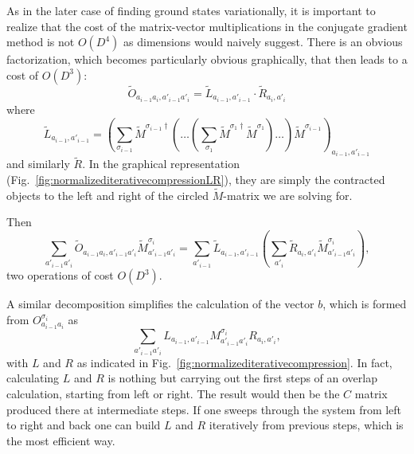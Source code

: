 As in the later case of finding ground states variationally, it is important to realize that the cost of the matrix-vector multiplications in the conjugate gradient method is not $O(D^4)$ as dimensions would naively suggest. There is an obvious factorization, which becomes particularly obvious graphically, that then leads to a cost of $O(D^3)$:
\begin{equation}
\tilde{O}_{a_{i-1}a_i,a'_{i-1}a'_i} = \tilde{L}_{a_{i-1},a'_{i-1}} \cdot \tilde{R}_{a_{i},a'_{i}}
\end{equation}
where 
\begin{equation}
\tilde{L}_{a_{i-1},a'_{i-1}} = \left( \sum_{\sigma_{i-1}}  \tilde{M}^{\sigma_{i-1}\dagger} \left( \ldots \left( \sum_{\sigma_1}  
\tilde{M}^{\sigma_{1}\dagger} \tilde{M}^{\sigma_{1}} \right) \ldots \right) \tilde{M}^{\sigma_{i-1}} \right)_{a_{i-1},a'_{i-1}}
\end{equation}
and similarly $\tilde{R}$. In the graphical representation (Fig.~\ref{fig:normalizediterativecompressionLR}), they are simply the contracted objects to the left and right of the circled $\tilde{M}$-matrix we are solving for.

Then 
\begin{equation}
\sum_{a'_{i-1}a'_i} \tilde{O}_{a_{i-1}a_i,a'_{i-1}a'_i} \tilde{M}^{\sigma_i}_{a'_{i-1}a'_i} =
\sum_{a'_{i-1}} \tilde{L}_{a_{i-1},a'_{i-1}} \left( \sum_{a'_i} \tilde{R}_{a_{i},a'_{i}}
 \tilde{M}^{\sigma_i}_{a'_{i-1}a'_i} \right),
\end{equation}
two operations of cost $O(D^3)$.

A similar decomposition simplifies the calculation of the vector $b$, which is formed from $O^{\sigma_i}_{a_{i-1}a_i}$ as
\begin{equation}
\sum_{a'_{i-1}a'_i} L_{a_{i-1},a'_{i-1}} M^{\sigma_i}_{a'_{i-1}a'_i} R_{a_{i},a'_{i}} , 
\end{equation}
with $L$ and $R$ as indicated in Fig.~\ref{fig:normalizediterativecompression}.
In fact, calculating $L$ and $R$ is nothing but carrying out the first steps of an overlap calculation, starting from left or right. The result would then be the $C$ matrix produced there at intermediate steps. If one sweeps through the system from left to right and back one can build $L$ and $R$ iteratively from previous steps, which is the most efficient way. 

